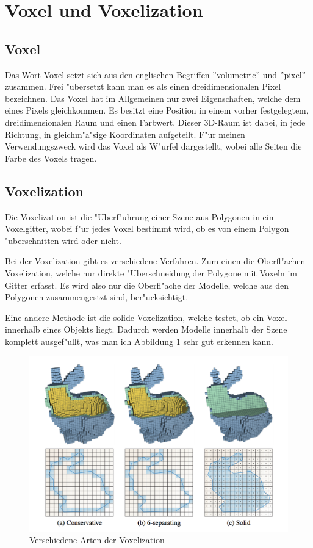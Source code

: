 \documentclass[a4paper, 12pt]{scrartcl}
\begin{document}
\section{Voxel und Voxelization}
\subsection{Voxel}
Das Wort Voxel setzt sich aus den englischen Begriffen ''volumetric'' und ''pixel'' zusammen. Frei "ubersetzt kann man es als einen dreidimensionalen Pixel bezeichnen.
Das Voxel hat im Allgemeinen nur zwei Eigenschaften, welche dem eines Pixels gleichkommen. Es besitzt eine Position in einem vorher festgelegtem, dreidimensionalen Raum und einen Farbwert.
Dieser 3D-Raum ist dabei, in jede Richtung, in gleichm"a"sige Koordinaten aufgeteilt.
F"ur meinen Verwendungszweck wird das Voxel als W"urfel dargestellt, wobei alle Seiten die Farbe des Voxels tragen.
\subsection{Voxelization}
Die Voxelization ist die "Uberf"uhrung einer Szene aus Polygonen in ein Voxelgitter, wobei f"ur jedes Voxel bestimmt wird, ob es von einem Polygon "uberschnitten wird oder nicht.

Bei der Voxelization gibt es verschiedene Verfahren. Zum einen die Oberfl"achen-Voxelization,  welche nur direkte "Uberschneidung der Polygone mit Voxeln im Gitter erfasst. Es wird also nur die Oberfl"ache der Modelle, welche aus den Polygonen zusammengestzt sind,  ber"ucksichtigt.

Eine andere Methode ist die solide Voxelization, welche testet, ob ein Voxel innerhalb eines Objekts liegt. Dadurch werden Modelle innerhalb der Szene komplett ausgef"ullt, was man ich Abbildung 1 sehr gut erkennen kann.

\begin{figure}[h]
	\centering
		\includegraphics[width=14cm]{Kinds-of-Voxelization}
	\caption{Verschiedene Arten der Voxelization}
\end{figure}
\end{document}
